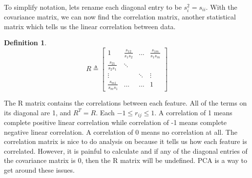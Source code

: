 \documentclass{article}
\newtheorem{definition}{Definition}
\begin{document}
To simplify notation, lets rename each diagonal entry to be $s_i^2=s_{ii}$.
With the covariance matrix, we can now find the correlation matrix, another statistical matrix which tells us the linear correlation between data.
\begin{definition}
    \[
        R \triangleq \left[
            \begin{array}{cccc}
                1 & \frac{s_{12}}{s_1s_2} & ... & \frac{s_{1m}}{s_1s_m}\\
                \frac{s_{21}}{s_2s_1} & \ddots & &\\
                \vdots & & \ddots & \vdots\\
                \frac{s_{m1}}{s_ms_1} & ... & ... & 1
            \end{array}
        \right]
    \]
\end{definition}
The R matrix contains the correlations between each feature. All of the terms on its diagonal are 1, and $R^T=R$.
Each $-1 \le r_{ij} \le 1$. A correlation of 1 means complete positive linear correlation while correlation of -1 means complete negative linear correlation.
A correlation of 0 means no correlation at all. The correlation matrix is nice to do analysis on because it tells us how each feature is correlated.
However, it is painful to calculate and if any of the diagonal entries of the covariance matrix is 0, then the R matrix will be undefined.
PCA is a way to get around these issues.
\end{document}
